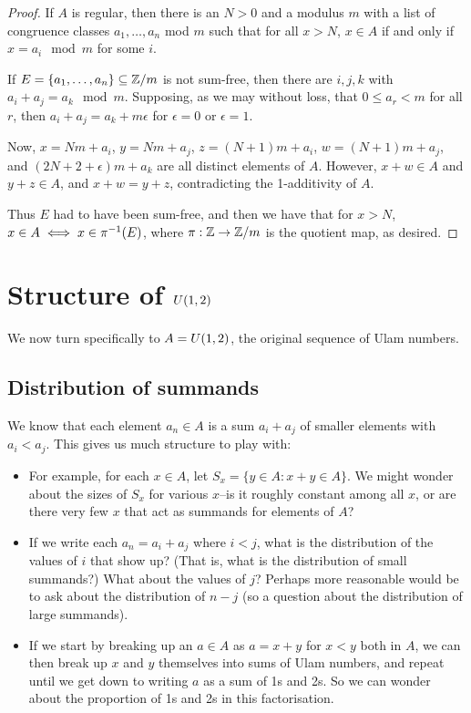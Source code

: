 \documentclass{report}
\theoremstyle{remark}
\numberwithin{equation}{section}
\begin{document}
\begin{proof}
  If $A$ is regular, then there is an $N > 0$ and a modulus $m$ with a
  list of congruence classes $a_1, \ldots, a_n$ mod $m$ such that for
  all $x > N$, $x \in A$ if and only if $x = a_i \mod{m}$ for some
  $i$.  

  If $E = \{a_1, \ldots, a_n\} \subseteq \mathbb{Z}/m$ is not sum-free, then there
  are $i, j, k$ with $a_i + a_j = a_k \mod{m}$.  Supposing, as we may
  without loss, that $0 \leq a_r < m$ for all $r$, then
  $a_i + a_j = a_k + m\epsilon$ for $\epsilon = 0$ or $\epsilon = 1$.

  Now, $x = Nm + a_i$, $y = Nm + a_j$, $z = (N+1)m + a_i$,
  $w = (N+1)m+a_j$, and $(2N+2+\epsilon)m + a_k$ are all distinct
  elements of $A$.  However, $x+w \in A$ and $y+z \in A$, and
  $x + w = y + z$, contradicting the 1-additivity of $A$.

  Thus $E$ had to have been sum-free, and then we have that for
  $x > N$, $x \in A \iff x \in \pi^{-1}(E)$, where $\pi : \mathbb{Z} \to \mathbb{Z}/m$
  is the quotient map, as desired.
\end{proof}

\chapter{Structure of $U(1,2)$}

We now turn specifically to $A = U(1,2)$, the original sequence
of Ulam numbers.   

\section{Distribution of summands}

We know that each element $a_n \in A$ is a sum $a_i + a_j$ of smaller elements
with $a_i < a_j$.  This gives us much structure to play with: 
\begin{itemize}
\item For example, for each $x \in A$, let
  $S_x = \{y \in A : x + y \in A\}$.  We might wonder about the sizes
  of $S_x$ for various $x$--is it roughly constant among all $x$, or
  are there very few $x$ that act as summands for elements of $A$?
\item If we write each $a_n = a_i + a_j$ where $i < j$, what is the
  distribution of the values of $i$ that show up?  (That is, what is
  the distribution of small summands?)  What about the values of
  $j$?  Perhaps more reasonable would be to ask about the distribution
  of $n-j$ (so a question about the distribution of large summands).
\item If we start by breaking up an $a \in A$ as $a = x+y$ for $x < y$
  both in $A$, we can then break up $x$ and $y$ themselves into sums
  of Ulam numbers, and repeat until we get down to writing $a$ as a
  sum of 1s and 2s.  So we can wonder about the proportion of 1s and
  2s in this factorisation.  
\end{itemize}
\end{document}
